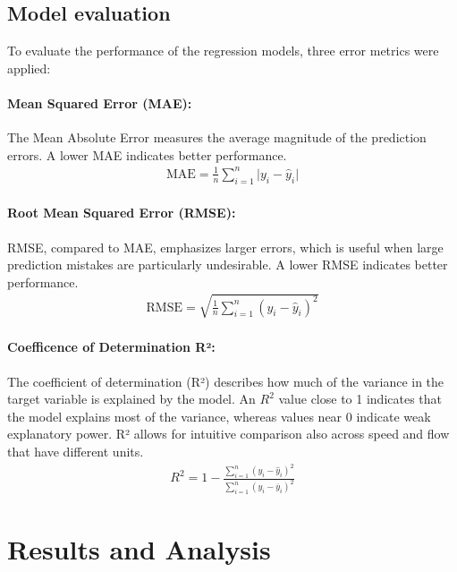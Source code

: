 	\subsection{Model evaluation}
	To evaluate the performance of the regression models, three error metrics were applied:
	\paragraph{Mean Squared Error (MAE):}
	The Mean Absolute Error measures the average magnitude of the prediction errors. A lower MAE indicates better performance.
	\begin{align}
		\text{MAE}=\frac{1}{n}\sum_{i=1}^{n}\vert y_i-\hat{y}_i\vert
	\end{align}
	\paragraph{Root Mean Squared Error (RMSE):}
	RMSE, compared to MAE, emphasizes larger errors, which is useful when large prediction mistakes are particularly undesirable. A lower RMSE indicates better performance.
	\begin{align}
		\text{RMSE}=\sqrt{\frac{1}{n}\sum_{i=1}^{n}\left( y_i-\hat{y}_i \right)^2}
	\end{align}
	\paragraph{Coefficence of Determination R²:}
	The coefficient of determination (R²) describes how much of the variance in the target variable is explained by the model. An $R^2$
	value close to 1 indicates that the model explains most of the variance, whereas values near 0 indicate weak explanatory power. R² allows for intuitive comparison also across speed and flow that have different units.
	\begin{align}
		R^2=1- \frac{\sum_{i=1}^{n}\left( y_i-\hat{y}_i \right)^2}{\sum_{i=1}^{n}\left( y_i-\overline{y}_i \right)^2}
	\end{align}
	
	\section{Results and Analysis}
